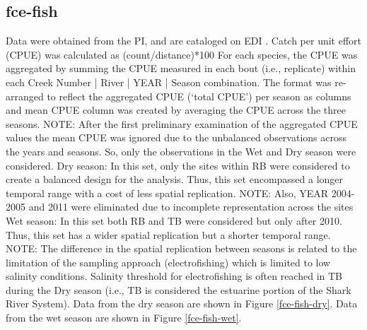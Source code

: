\documentclass[11pt, oneside]{article}
\begin{document}
\subsection {fce-fish}
Data were obtained from the PI, and are cataloged on EDI  \citep{fce-fish}.
Catch per unit effort (CPUE) was calculated as (count/distance)*100
For each species, the CPUE was aggregated by summing the CPUE measured in each bout (i.e., replicate) within each Creek Number | River | YEAR | Season combination.
The format was re-arranged to reflect the aggregated CPUE (`total CPUE') per season as columns and mean CPUE column was created by averaging the CPUE across the three seasons.
NOTE: After the first preliminary examination of the aggregated CPUE values the mean CPUE was ignored due to the unbalanced observations across the years and seasons. 
So, only the observations in the Wet and Dry season were considered.
Dry season: In this set, only the sites within RB were considered to create a balanced design for the analysis. 
Thus, this set encompassed a longer temporal range with a cost of less spatial replication.
NOTE: Also, YEAR 2004-2005 and 2011 were eliminated due to incomplete representation across the sites
Wet season: In this set both RB and TB were considered but only after 2010. Thus, this set has a wider spatial replication but a shorter temporal range.
NOTE: The difference in the spatial replication between seasons is related to the limitation of the sampling approach (electrofishing) which is limited to low salinity conditions. 
Salinity threshold for electrofishing is often reached in TB during the Dry season (i.e., TB is considered the estuarine portion of the Shark River System).
Data from the dry season are shown in Figure \ref{fce-fish-dry}.
Data from the wet season are shown in Figure \ref{fce-fish-wet}.
\end{document}
